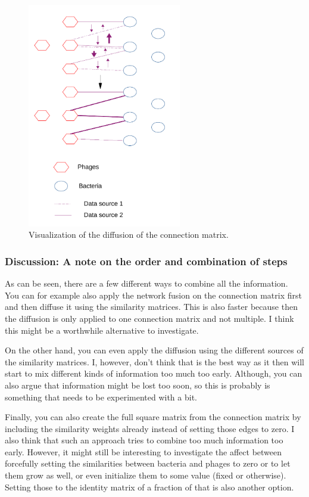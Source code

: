 \documentclass{article}
\begin{document}
\begin{figure}[hb]
    \centering
    \includegraphics[width=0.6\textwidth]{img/connection-diff_cropped.pdf}
    \caption{Visualization of the diffusion of the connection matrix.}\label{fig:connectdiff}
\end{figure}

\subsubsection{Discussion: A note on the order and combination of steps}

As can be seen, there are a few different ways to combine all the information.
You can for example also apply the network fusion on the connection matrix
first and then diffuse it using the similarity matrices. This is also 
faster because then the diffusion is only applied to one connection matrix
and not multiple. I think this might be a worthwhile alternative to investigate.

On the other hand, you can even apply the diffusion
using the different sources of the similarity matrices. I, however, don't
think that is the best way as it then will start to mix different kinds 
of information too much too early. Although, you can also argue that information
might be lost too soon, so this is probably is something that needs to be
experimented with a bit.

Finally, you can
also create the full square matrix from the connection matrix by including the
similarity weights already instead of setting those edges to zero. I also 
think that such an approach tries to combine too much information too early.
However, it might still be interesting to investigate the affect between
forcefully setting the similarities between bacteria and phages to zero 
or to let them grow as well, or even initialize them to some value (fixed
or otherwise). Setting those to the identity matrix of a fraction of that 
is also another option.
\end{document}
